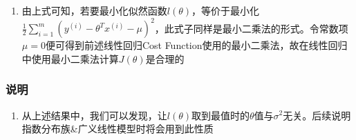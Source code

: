 \begin{enumerate}
	\item 由上式可知，若要最小化似然函数$l(\theta)$，等价于最小化$\frac{1}{2} \sum_{i=1}^{m}\left(y^{(i)}-\theta^Tx^{(i)}-\mu\right)^2$，此式子同样是最小二乘法的形式。令常数项$\mu = 0$便可得到前述线性回归Cost Function使用的最小二乘法，故在线性回归中使用最小二乘法计算$J(\theta)$是合理的

\end{enumerate}

\subsubsection{说明}
\begin{enumerate}
	\item 从上述结果中，我们可以发现，让$l(\theta)$取到最值时的$\theta$值与$\sigma^2$无关。后续说明指数分布族\&广义线性模型时将会用到此性质
\end{enumerate}













